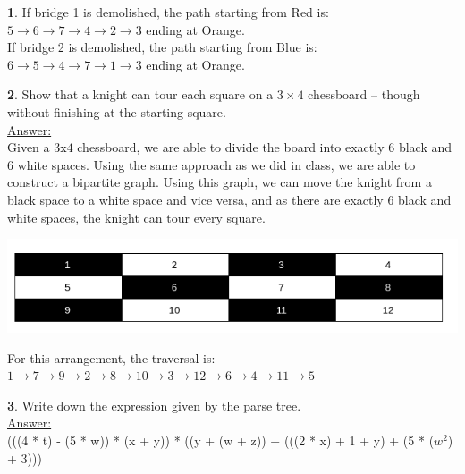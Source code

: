 \documentclass[12pt,a4paper]{article}
\theoremstyle{definition}
\newtheorem{problem}{}
\begin{document}
\begin{problem}
If bridge 1 is demolished, the path starting from Red is: \\

$5 \rightarrow 6 \rightarrow 7 \rightarrow 4 \rightarrow 2 \rightarrow 3$ ending at Orange. \\

If bridge 2 is demolished, the path starting from Blue is: \\

$6 \rightarrow 5 \rightarrow 4 \rightarrow 7 \rightarrow 1 \rightarrow 3$ ending at Orange.

\end{problem}

\begin{problem}
Show that a knight can tour each square on a $3\times 4$ chessboard -- though without finishing at the starting square. \\

\underline{Answer:} \\
Given a $3$x$4$ chessboard, we are able to divide the board into exactly $6$ black and $6$ white spaces. Using the same approach as we did in class, we are able to construct a bipartite graph. Using this graph, we can move the knight from a black space to a white space and vice versa, and as there are exactly $6$ black and white spaces, the knight can tour every square. \\

\centerline{\includegraphics[scale=0.4]{chessboard.png}}
For this arrangement, the traversal is: \\

$1 \rightarrow 7 \rightarrow 9 \rightarrow 2 \rightarrow 8 \rightarrow 10 \rightarrow 3 \rightarrow 12 \rightarrow 6 \rightarrow 4 \rightarrow 11 \rightarrow 5$

\end{problem}

\begin{problem}
Write down the expression given by the parse tree.\\

\underline{Answer:} \\
(((4 * t) - (5 * w)) * (x + y)) * ((y + (w + z)) + (((2 * x) + 1 + y) + (5 * ($w^2$) + 3)))

\end{problem}
\end{document}
